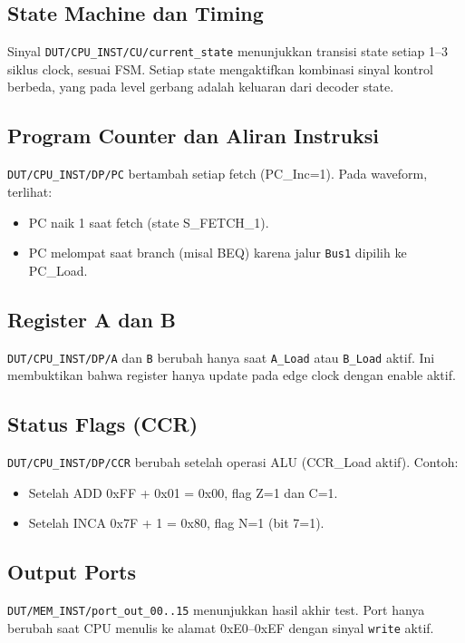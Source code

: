 \documentclass[12pt,a4paper]{report}
\begin{document}
\subsection{State Machine dan Timing}

Sinyal \texttt{DUT/CPU\_INST/CU/current\_state} menunjukkan transisi state setiap 1--3 siklus clock, sesuai FSM. Setiap state mengaktifkan kombinasi sinyal kontrol berbeda, yang pada level gerbang adalah keluaran dari decoder state.

\subsection{Program Counter dan Aliran Instruksi}

\texttt{DUT/CPU\_INST/DP/PC} bertambah setiap fetch (PC\_Inc=1). Pada waveform, terlihat:
\begin{itemize}
  \item PC naik 1 saat fetch (state S\_FETCH\_1).
  \item PC melompat saat branch (misal BEQ) karena jalur \texttt{Bus1} dipilih ke PC\_Load.
\end{itemize}

\subsection{Register A dan B}

\texttt{DUT/CPU\_INST/DP/A} dan \texttt{B} berubah hanya saat \texttt{A\_Load} atau \texttt{B\_Load} aktif. Ini membuktikan bahwa register hanya update pada edge clock dengan enable aktif.

\subsection{Status Flags (CCR)}

\texttt{DUT/CPU\_INST/DP/CCR} berubah setelah operasi ALU (CCR\_Load aktif). Contoh:
\begin{itemize}
  \item Setelah ADD 0xFF + 0x01 = 0x00, flag Z=1 dan C=1.
  \item Setelah INCA 0x7F + 1 = 0x80, flag N=1 (bit 7=1).
\end{itemize}

\subsection{Output Ports}

\texttt{DUT/MEM\_INST/port\_out\_00..15} menunjukkan hasil akhir test. Port hanya berubah saat CPU menulis ke alamat 0xE0--0xEF dengan sinyal \texttt{write} aktif.
\end{document}
